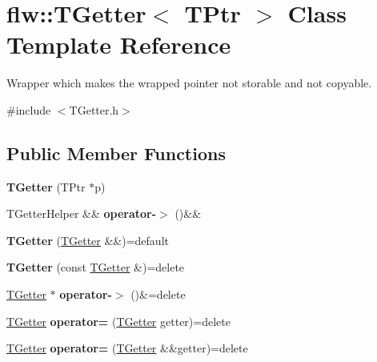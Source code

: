 \hypertarget{classflw_1_1TGetter}{}\section{flw\+:\+:T\+Getter$<$ T\+Ptr $>$ Class Template Reference}
\label{classflw_1_1TGetter}


Wrapper which makes the wrapped pointer not storable and not copyable.  




{\ttfamily \#include $<$T\+Getter.\+h$>$}

\subsection*{Public Member Functions}
\begin{DoxyCompactItemize}
\item 
{\bfseries T\+Getter} (T\+Ptr $\ast$p)\hypertarget{classflw_1_1TGetter_a756ebc5ae284108cba466609022f1812}{}\label{classflw_1_1TGetter_a756ebc5ae284108cba466609022f1812}

\item 
T\+Getter\+Helper \&\& {\bfseries operator-\/$>$} ()\&\&\hypertarget{classflw_1_1TGetter_a9910939ff0dee671b25d01b4fe15e116}{}\label{classflw_1_1TGetter_a9910939ff0dee671b25d01b4fe15e116}

\item 
{\bfseries T\+Getter} (\hyperlink{classflw_1_1TGetter}{T\+Getter} \&\&)=default\hypertarget{classflw_1_1TGetter_add5f91ce191abb5bbf629704d90a5a01}{}\label{classflw_1_1TGetter_add5f91ce191abb5bbf629704d90a5a01}

\item 
{\bfseries T\+Getter} (const \hyperlink{classflw_1_1TGetter}{T\+Getter} \&)=delete\hypertarget{classflw_1_1TGetter_af0df32472acde6413b0e54e52bfa99ae}{}\label{classflw_1_1TGetter_af0df32472acde6413b0e54e52bfa99ae}

\item 
\hyperlink{classflw_1_1TGetter}{T\+Getter} $\ast$ {\bfseries operator-\/$>$} ()\&=delete\hypertarget{classflw_1_1TGetter_a90e0d7e60cc812d05f10be7503bff29c}{}\label{classflw_1_1TGetter_a90e0d7e60cc812d05f10be7503bff29c}

\item 
\hyperlink{classflw_1_1TGetter}{T\+Getter} {\bfseries operator=} (\hyperlink{classflw_1_1TGetter}{T\+Getter} getter)=delete\hypertarget{classflw_1_1TGetter_abde628d0ddf0a374f955a323f243f1b7}{}\label{classflw_1_1TGetter_abde628d0ddf0a374f955a323f243f1b7}

\item 
\hyperlink{classflw_1_1TGetter}{T\+Getter} {\bfseries operator=} (\hyperlink{classflw_1_1TGetter}{T\+Getter} \&\&getter)=delete\hypertarget{classflw_1_1TGetter_a4bd3efb6cbb6018d7303e1330b3c523f}{}\label{classflw_1_1TGetter_a4bd3efb6cbb6018d7303e1330b3c523f}

\end{DoxyCompactItemize}


